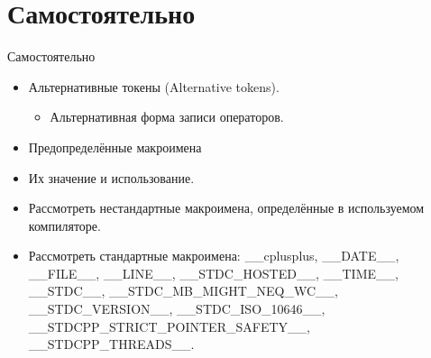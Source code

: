     \section{Самостоятельно}
    \begin{frame}{Самостоятельно}
        \begin{itemize}
            \item Альтернативные токены (Alternative tokens).
                \begin{itemize}
                    \item Альтернативная форма записи операторов.
                \end{itemize}
            \item Предопределённые макроимена
                    \item Их значение и использование.
                    \item Рассмотреть нестандартные макроимена, определённые в используемом компиляторе.
                    \item Рассмотреть стандартные макроимена:
                        \_\_cplusplus,
                        \_\_DATE\_\_,
                        \_\_FILE\_\_,
                        \_\_LINE\_\_,
                        \_\_STDC\_HOSTED\_\_,
                        \_\_TIME\_\_,
                        \_\_STDC\_\_,
                        \_\_STDC\_MB\_MIGHT\_NEQ\_WC\_\_,
                        \_\_STDC\_VERSION\_\_,
                        \_\_STDC\_ISO\_10646\_\_,
                        \_\_STDCPP\_STRICT\_POINTER\_SAFETY\_\_,
                        \_\_STDCPP\_THREADS\_\_.
        \end{itemize}
    \end{frame}

